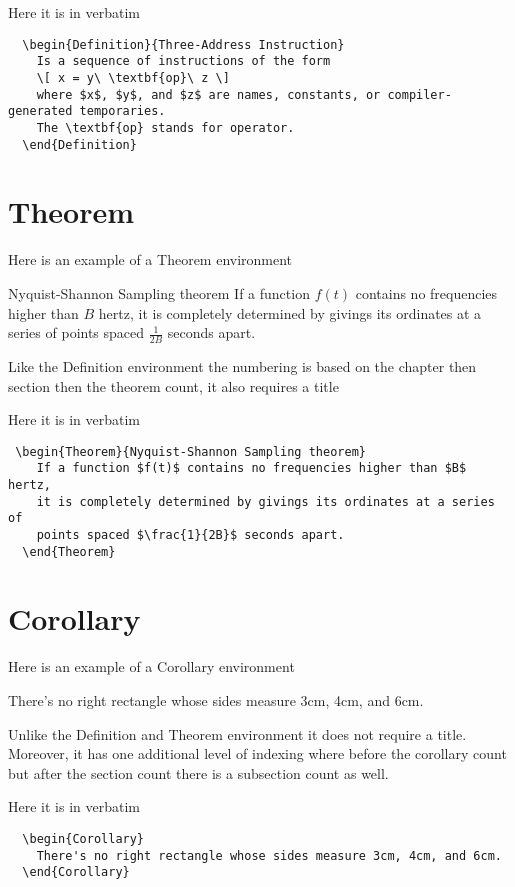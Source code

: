 \documentclass[letterpaper,10pt,twoside,onecolumn,openany,draft]{book}
\begin{document}
Here it is in verbatim
\begin{verbatim}
  \begin{Definition}{Three-Address Instruction}
    Is a sequence of instructions of the form 
    \[ x = y\ \textbf{op}\ z \] 
    where $x$, $y$, and $z$ are names, constants, or compiler-generated temporaries. 
    The \textbf{op} stands for operator. 
  \end{Definition}
\end{verbatim}

\section{Theorem}
Here is an example of a Theorem environment
\begin{Theorem}{Nyquist-Shannon Sampling theorem}
  If a function $f(t)$ contains no frequencies higher than $B$ hertz, it is completely determined by givings its ordinates at a series of points spaced $\frac{1}{2B}$ seconds apart.
\end{Theorem}
Like the Definition environment the numbering is based on the chapter then section then the theorem count, it also requires a title

Here it is in verbatim
\begin{verbatim}
 \begin{Theorem}{Nyquist-Shannon Sampling theorem}
    If a function $f(t)$ contains no frequencies higher than $B$ hertz,
    it is completely determined by givings its ordinates at a series of 
    points spaced $\frac{1}{2B}$ seconds apart.
  \end{Theorem}
\end{verbatim}

\section{Corollary}
Here is an example of a Corollary environment
\begin{Corollary}
  There's no right rectangle whose sides measure 3cm, 4cm, and 6cm.  
\end{Corollary}
Unlike the Definition and Theorem environment it does not require a title. Moreover, it has one additional level of indexing where before the corollary count but after the section count there is a subsection count as well.

Here it is in verbatim 
\begin{verbatim}
  \begin{Corollary}
    There's no right rectangle whose sides measure 3cm, 4cm, and 6cm.  
  \end{Corollary}
\end{verbatim}
\end{document}
